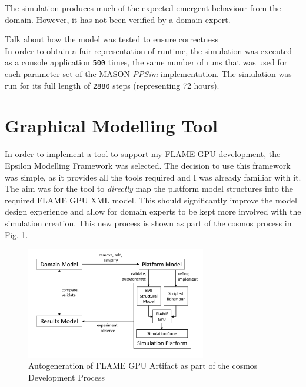 \documentclass{UoYCSproject}
\begin{document}
The simulation produces much of the expected emergent behaviour from the domain.
However, it has not been verified by a domain expert.


Talk about how the model was tested to ensure correctness\\

In order to obtain a fair representation of runtime, the simulation was executed as a console application \texttt{500} times, the same number of runs that was used for each parameter set of the MASON \textit{PPSim} implementation.
The simulation was run for its full length of \texttt{2880} steps (representing 72 hours).

\section{Graphical Modelling Tool}
In order to implement a tool to support my \gls{FLAME GPU} development, the Epsilon Modelling Framework was selected.
The decision to use this framework was simple, as it provides all the tools required and I was already familiar with it.
The aim was for the tool to \textit{directly} map the platform model structures into the required \gls{FLAME GPU} XML model.
This should significantly improve the model design experience and allow for domain experts to be kept more involved with the simulation creation.
This new process is shown as part of the \gls{cosmos} process in Fig. \ref{fig:flame_improved}.

\begin{figure}[htp]
\centering
\includegraphics[width=0.7\textwidth]{Appendix/CoSMoS_FLAME}
\caption{Autogeneration of \gls{FLAME GPU} Artifact as part of the \gls{cosmos} Development Process}
\label{fig:flame_improved}
\end{figure}
\end{document}
